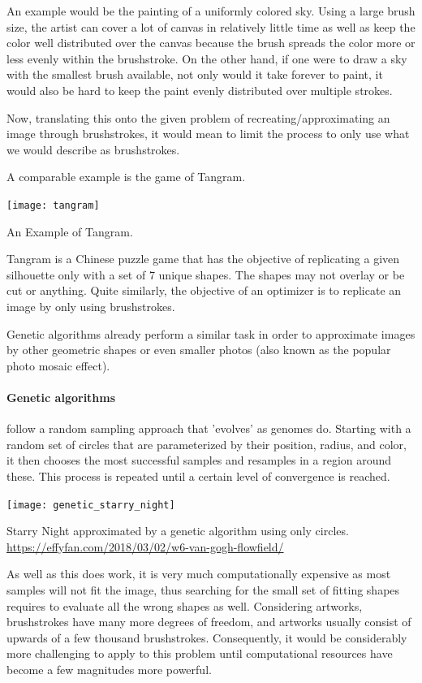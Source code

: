 An example would be the painting of a uniformly colored sky.
Using a large brush size, the artist can cover a lot of canvas in relatively little time as well as keep the color well distributed over the canvas because the brush spreads the color more or less evenly within the brushstroke.
On the other hand, if one were to draw a sky with the smallest brush available, not only would it take forever to paint, it would also be hard to keep the paint evenly distributed over multiple strokes.

Now, translating this onto the given problem of recreating/approximating an image through brushstrokes, it would mean to limit the process to only use what we would describe as brushstrokes. 

A comparable example is the game of Tangram.

\begin{marginfigure}
    \texttt{[image: tangram]}
    \caption[]{An Example of Tangram.}
\end{marginfigure}

Tangram is a Chinese puzzle game that has the objective of replicating a given silhouette only with a set of 7 unique shapes.
The shapes may not overlay or be cut or anything.
Quite similarly, the objective of an optimizer is to replicate an image by only using brushstrokes.


Genetic algorithms already perform a similar task in order to approximate images by other geometric shapes or even smaller photos (also known as the popular photo mosaic effect).
\paragraph{Genetic algorithms} follow a random sampling approach that 'evolves' as genomes do.
Starting with a random set of circles that are parameterized by their position, radius, and color, it then chooses the most successful samples and resamples in a region around these.
This process is repeated until a certain level of convergence is reached.

\begin{marginfigure}
    \texttt{[image: genetic\_starry\_night]}
    \caption[]{Starry Night approximated by a genetic algorithm using only circles. \url{https://effyfan.com/2018/03/02/w6-van-gogh-flowfield/}}
\end{marginfigure}

As well as this does work, it is very much computationally expensive as most samples will not fit the image, thus searching for the small set of fitting shapes requires to evaluate all the wrong shapes as well.
Considering artworks, brushstrokes have many more degrees of freedom, and artworks usually consist of upwards of a few thousand brushstrokes.
Consequently, it would be considerably more challenging to apply to this problem until computational resources have become a few magnitudes more powerful.

